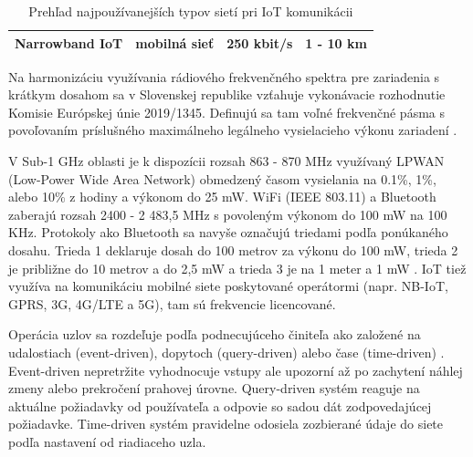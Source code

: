 \begin{table}[h]
\begin{tabular}{|l|r|rr|r|}
Narrowband IoT                                                                   & \multicolumn{1}{l|}{mobilná sieť}                                                                 & \multicolumn{2}{r|}{250 kbit/s}                                                                                                                                                                 & \multicolumn{1}{l|}{1 - 10 km}                                                          \\ \hline
\end{tabular}
\caption{Prehľad najpoužívanejších typov sietí pri IoT komunikácii}
\label{tab:net-protocols}
\end{table}

Na harmonizáciu využívania rádiového frekvenčného spektra pre zariadenia s krátkym dosahom sa v
Slovenskej republike vzťahuje vykonávacie rozhodnutie Komisie Európskej únie 2019/1345. Definujú sa
tam voľné frekvenčné pásma s povoľovaním príslušného maximálneho legálneho vysielacieho výkonu
zariadení \cite{eu-frequencies}.

V Sub-1 GHz oblasti je k dispozícii rozsah 863 - 870 MHz využívaný LPWAN (Low-Power Wide Area Network) obmedzený
časom vysielania na 0.1\%, 1\%, alebo 10\% z hodiny a výkonom do 25 mW. WiFi (IEEE 803.11) a Bluetooth zaberajú
rozsah 2400 - 2 483,5 MHz s povoleným výkonom do 100 mW na 100 KHz. Protokoly
ako Bluetooth sa navyše označujú triedami podľa ponúkaného dosahu. Trieda 1 deklaruje dosah do 100 metrov za výkonu
do 100 mW, trieda 2 je približne do 10 metrov a do 2,5 mW a trieda 3 je na 1 meter a 1 mW \cite{bluetooth}.
IoT tiež využíva na komunikáciu mobilné siete poskytované operátormi (napr. NB-IoT, GPRS, 3G, 4G/LTE a 5G),
tam sú frekvencie licencované.

Operácia uzlov sa rozdeľuje podľa podnecujúceho činiteľa ako založené na udalostiach (event-driven),
dopytoch (query-driven) alebo čase (time-driven) \cite{big-data-collection-wsn}. Event-driven
nepretržite vyhodnocuje vstupy ale upozorní až po zachytení náhlej zmeny alebo prekročení prahovej úrovne.
Query-driven systém reaguje na aktuálne požiadavky od používateľa a odpovie so sadou dát zodpovedajúcej požiadavke.
Time-driven systém pravidelne odosiela zozbierané údaje do siete podľa nastavení od riadiaceho uzla.

